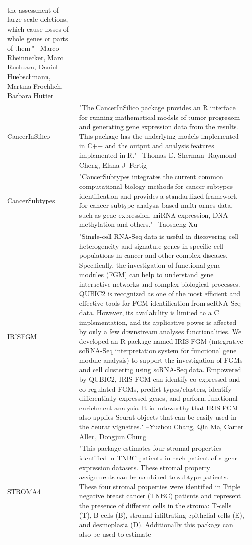 \documentclass[]{article}
\begin{document}
\begin{longtable}[t]{l>{\raggedright\arraybackslash}p{25em}}
the assessment of large scale deletions, which cause losses of
whole genes or parts of them." --Marco Rheinnecker, Marc Ruebsam, Daniel Huebschmann, Martina Froehlich, Barbara Hutter\\
CancerInSilico & "The CancerInSilico package provides an R interface for
running mathematical models of tumor progresson and generating
gene expression data from the results. This package has the
underlying models implemented in C++ and the output and
analysis features implemented in R." --Thomas D. Sherman, Raymond Cheng, Elana J. Fertig\\
\addlinespace
CancerSubtypes & "CancerSubtypes integrates the current common computational
biology methods for cancer subtypes identification and provides
a standardized framework for cancer subtype analysis based
multi-omics data, such as gene expression, miRNA expression,
DNA methylation and others." --Taosheng Xu\\
IRISFGM & "Single-cell RNA-Seq data is useful in discovering cell
heterogeneity and signature genes in specific cell populations
in cancer and other complex diseases. Specifically, the
investigation of functional gene modules (FGM) can help to
understand gene interactive networks and complex biological
processes. QUBIC2 is recognized as one of the most efficient
and effective tools for FGM identification from scRNA-Seq data.
However, its availability is limited to a C implementation, and
its applicative power is affected by only a few downstream
analyses functionalities. We developed an R package named
IRIS-FGM (integrative scRNA-Seq interpretation system for
functional gene module analysis) to support the investigation
of FGMs and cell clustering using scRNA-Seq data. Empowered by
QUBIC2, IRIS-FGM can identify co-expressed and co-regulated
FGMs, predict types/clusters, identify differentially expressed
genes, and perform functional enrichment analysis. It is
noteworthy that IRIS-FGM also applies Seurat objects that can
be easily used in the Seurat vignettes." --Yuzhou Chang, Qin Ma, Carter Allen, Dongjun Chung\\
STROMA4 & "This package estimates four stromal properties identified
in TNBC patients in each patient of a gene expression datasets.
These stromal property assignments can be combined to subtype
patients. These four stromal properties were identified in
Triple negative breast cancer (TNBC) patients and represent the
presence of different cells in the stroma: T-cells (T), B-cells
(B), stromal infiltrating epithelial cells (E), and desmoplasia
(D). Additionally this package can also be used to estimate

\end{longtable}
\end{document}
